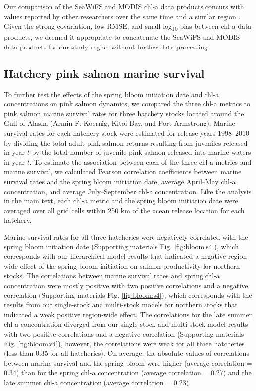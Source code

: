 Our comparison of the SeaWiFS and MODIS chl-a data products concurs with values
reported by other researchers over the same time and a similar region
\citep{Waite2013}. Given the strong covariation, low RMSE, and small
log\textsubscript{10} bias between chl-a data products, we deemed it appropriate
to concatenate the SeaWiFS and MODIS data products for our study region without
further data processing.


\subsection{Hatchery pink salmon marine survival}
\label{supp:bloom:B}

To further test the effects of the spring bloom initiation date and chl-a
concentrations on pink salmon dynamics, we compared the three chl-a metrics to
pink salmon marine survival rates for three hatchery stocks located around the
Gulf of Alaska (Armin F. Koernig, Kitoi Bay, and Port Armstrong). Marine
survival rates for each hatchery stock were estimated for release years
1998--2010 by dividing the total adult pink salmon returns resulting from
juveniles released in year \(t\) by the total number of juvenile pink salmon
released into marine waters in year \(t\). To estimate the association between
each of the three chl-a metrics and marine survival, we calculated Pearson
correlation coefficients between marine survival rates and the spring bloom
initiation date, average April--May chl-a concentration, and average
July--September chl-a concentration. Like the analysis in the main text, each
chl-a metric and the spring bloom initiation date were averaged over all grid
cells within 250 km of the ocean release location for each hatchery.

Marine survival rates for all three hatcheries were negatively correlated with
the spring bloom initiation date (Supporting materials Fig.
\ref{fig:bloom:s4}), which corresponds with our hierarchical model results that
indicated a negative region-wide effect of the spring bloom initiation on salmon
productivity for northern stocks. The correlations between marine survival rates
and spring chl-a concentration were mostly positive with two positive
correlations and a negative correlation (Supporting materials Fig.
\ref{fig:bloom:s4}), which corresponds with the results from our single-stock
and multi-stock models for northern stocks that indicated a weak positive
region-wide effect. The correlations for the late summer chl-a concentration
diverged from our single-stock and multi-stock model results with two positive
correlations and a negative correlation (Supporting materials Fig.
\ref{fig:bloom:s4}), however, the correlations were weak for all three
hatcheries (less than 0.35 for all hatcheries). On average, the absolute values
of correlations between marine survival and the spring bloom were higher
(average correlation = 0.34) than for the spring chl-a concentration (average
correlation = 0.27) and the late summer chl-a concentration (average correlation
= 0.23).

